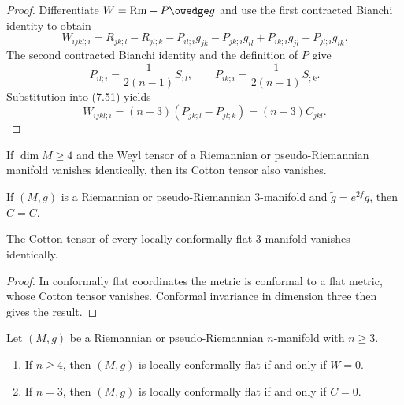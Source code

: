 \begin{proof}
\sketch
Differentiate $W=\mathrm{Rm}-P\owedge g$ and use the first contracted Bianchi
identity to obtain
\begin{equation}
W_{ijkl;i}=R_{jk;l}-R_{jl;k}-P_{il;i}g_{jk}-P_{jk;i}g_{il}
+P_{ik;i}g_{jl}+P_{jl;i}g_{ik}. \tag{7.51}
\end{equation}
The second contracted Bianchi identity and the definition of $P$ give
\[
P_{il;i}=\frac1{2(n-1)}S_{;l},
\qquad
P_{ik;i}=\frac1{2(n-1)}S_{;k}.
\]
Substitution into (7.51) yields
\[
W_{ijkl;i}=(n-3)(P_{jk;l}-P_{jl;k})=(n-3)C_{jkl}.
\]
\end{proof}

\begin{corollary}
\label{cor:weyl-cotton-vanish-dimension-4}
If $\dim M\geq4$ and the Weyl tensor of a Riemannian or pseudo-Riemannian
manifold vanishes identically, then its Cotton tensor also vanishes.
\end{corollary}

\begin{proposition}
\label{prop:conformal-invariance-cotton-dim3}
If $(M,g)$ is a Riemannian or pseudo-Riemannian $3$-manifold and
$\widetilde g=e^{2f}g$, then $\widetilde C=C$.
\end{proposition}

\begin{corollary}
\label{cor:cotton-tensor-vanishes-conformally-flat}
The Cotton tensor of every locally conformally flat $3$-manifold vanishes
identically.
\end{corollary}
\begin{proof}
\sketch
In conformally flat coordinates the metric is conformal to a flat metric,
whose Cotton tensor vanishes. Conformal invariance in dimension three then
gives the result.
\end{proof}

\begin{theorem}
\label{thm:weyl-schouten}
Let $(M,g)$ be a Riemannian or pseudo-Riemannian $n$-manifold with $n\geq3$.
\begin{enumerate}
\item[(a)] If $n\geq4$, then $(M,g)$ is locally conformally flat if and only
if $W=0$.
\item[(b)] If $n=3$, then $(M,g)$ is locally conformally flat if and only if
$C=0$.
\end{enumerate}
\end{theorem}

